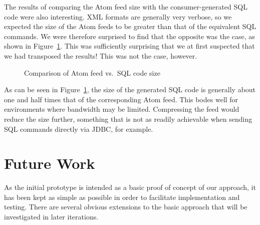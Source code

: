 \documentclass{CRPITStyle}
\begin{document}
The results of comparing the Atom feed size with the consumer-generated
SQL code were also interesting. XML formats are generally very verbose,
so we expected the size of the Atom feeds to be greater than that of the
equivalent SQL commands. We were therefore surprised to find that the
opposite was the case, as shown in Figure~\ref{fig-sizes}. This was
sufficiently surprising that we at first suspected that we had
transposed the results! This was not the case, however.


\begin{figure}
	\caption{Comparison of Atom feed vs.\ SQL code size}
	\label{fig-sizes}
\end{figure}


As can be seen in Figure~\ref{fig-sizes}, the size of the generated SQL
code is generally about one and half times that of the corresponding
Atom feed. This bodes well for environments where bandwidth may be
limited. Compressing the feed would reduce the size further, something
that is not as readily achievable when sending SQL commands directly via
JDBC, for example.


\section{Future Work}
\label{sec-future-work}

As the initial prototype is intended as a basic proof of concept of our
approach, it has been kept as simple as possible in order to facilitate
implementation and testing. There are several obvious extensions to the
basic approach that will be investigated in later iterations.
\end{document}
